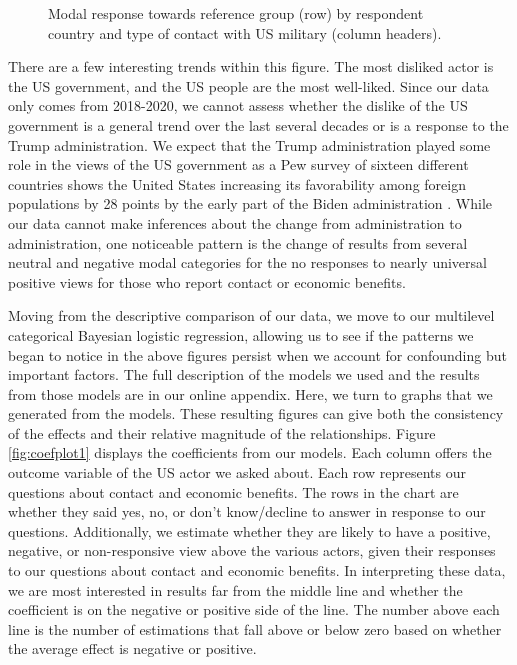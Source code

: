 \begin{figure}[t]
	\centering{}
	\caption{Modal response towards reference group (row) by respondent country and type of contact with US military (column headers).}
	\label{fig:tileplot}
\end{figure}%


There are a few interesting trends within this figure. The most disliked actor is the US government, and the US people are the most well-liked. Since our data only comes from 2018-2020, we cannot assess whether the dislike of the US government is a general trend over the last several decades or is a response to the Trump administration. We expect that the Trump administration played some role in the views of the US government as a Pew survey of sixteen different countries shows the United States increasing its favorability among foreign populations by 28 points by the early part of the Biden administration \cite{Wike2021}. While our data cannot make inferences about the change from administration to administration, one noticeable pattern is the change of results from several neutral and negative modal categories for the no responses to nearly universal positive views for those who report contact or economic benefits.  


Moving from the descriptive comparison of our data, we move to our multilevel categorical Bayesian logistic regression, allowing us to see if the patterns we began to notice in the above figures persist when we account for confounding but important factors. The full description of the models we used and the results from those models are in our online appendix. Here, we turn to graphs that we generated from the models. These resulting figures can give both the consistency of the effects and their relative magnitude of the relationships. Figure \ref{fig:coefplot1} displays the coefficients from our models. Each column offers the outcome variable of the US actor we asked about. Each row represents our questions about contact and economic benefits. The rows in the chart are whether they said yes, no, or don't know/decline to answer in response to our questions.
Additionally, we estimate whether they are likely to have a positive, negative, or non-responsive view above the various actors, given their responses to our questions about contact and economic benefits. In interpreting these data, we are most interested in results far from the middle line and whether the coefficient is on the negative or positive side of the line. The number above each line is the number of estimations that fall above or below zero based on whether the average effect is negative or positive.

